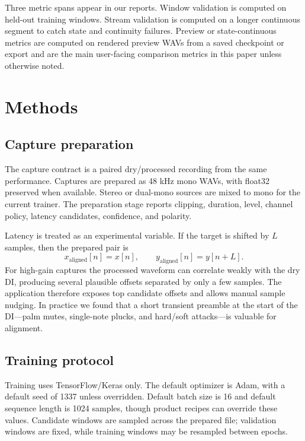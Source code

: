 \documentclass[11pt]{article}
\begin{document}
Three metric spans appear in our reports. Window validation is computed on
held-out training windows. Stream validation is computed on a longer
continuous segment to catch state and continuity failures. Preview or
state-continuous metrics are computed on rendered preview WAVs from a saved
checkpoint or export and are the main user-facing comparison metrics in this
paper unless otherwise noted.

\section{Methods}

\subsection{Capture preparation}

The capture contract is a paired dry/processed recording from the same
performance. Captures are prepared as 48 kHz mono WAVs, with float32 preserved
when available. Stereo or dual-mono sources are mixed to mono for the current
trainer. The preparation stage reports clipping, duration, level, channel
policy, latency candidates, confidence, and polarity.

Latency is treated as an experimental variable. If the target is shifted by
\(L\) samples, then the prepared pair is
\begin{equation}
  x_{\mathrm{aligned}}[n] = x[n], \qquad
  y_{\mathrm{aligned}}[n] = y[n+L].
\end{equation}
For high-gain captures the processed waveform can correlate weakly with the
dry DI, producing several plausible offsets separated by only a few samples.
The application therefore exposes top candidate offsets and allows manual
sample nudging. In practice we found that a short transient preamble at the
start of the DI---palm mutes, single-note plucks, and hard/soft attacks---is
valuable for alignment.

\subsection{Training protocol}

Training uses TensorFlow/Keras only. The default optimizer is Adam, with a
default seed of 1337 unless overridden. Default batch size is 16 and default
sequence length is 1024 samples, though product recipes can override these
values. Candidate windows are sampled across the prepared file; validation
windows are fixed, while training windows may be resampled between epochs.
\end{document}
